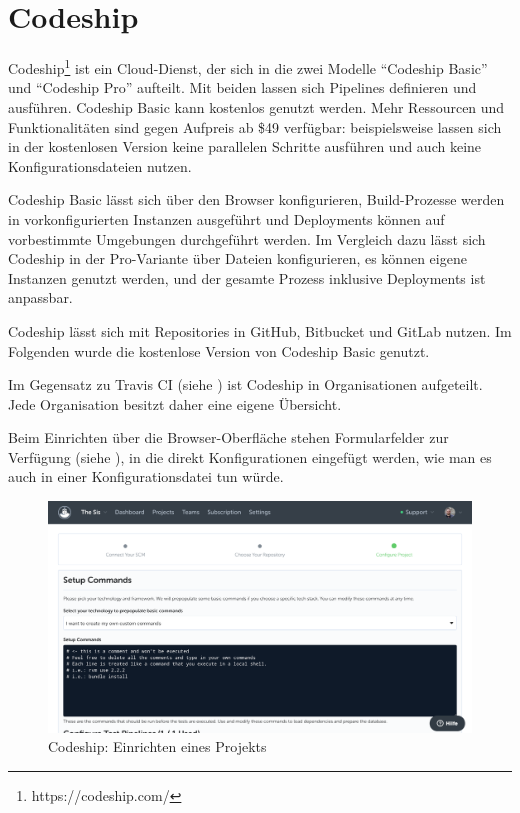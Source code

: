 \section{Codeship}
\label{sec:analyse-codeship}

Codeship\footnote{https://codeship.com/} ist ein Cloud-Dienst, der sich in die zwei Modelle ``Codeship Basic'' und ``Codeship Pro'' aufteilt. Mit beiden lassen sich Pipelines definieren und ausführen. Codeship Basic kann kostenlos genutzt werden. Mehr Ressourcen und Funktionalitäten sind gegen Aufpreis ab \$49 verfügbar: beispielsweise lassen sich in der kostenlosen Version keine parallelen Schritte ausführen und auch keine Konfigurationsdateien nutzen.

Codeship Basic lässt sich über den Browser konfigurieren, Build-Prozesse werden in vorkonfigurierten Instanzen ausgeführt und Deployments können auf vorbestimmte Umgebungen durchgeführt werden. Im Vergleich dazu lässt sich Codeship in der Pro-Variante über Dateien konfigurieren, es können eigene Instanzen genutzt werden, und der gesamte Prozess inklusive Deployments ist anpassbar.

Codeship lässt sich mit Repositories in GitHub, Bitbucket und GitLab nutzen. Im Folgenden wurde die kostenlose Version von Codeship Basic genutzt.

Im Gegensatz zu Travis CI (siehe ) ist Codeship in Organisationen aufgeteilt. Jede Organisation besitzt daher eine eigene Übersicht.

Beim Einrichten über die Browser-Oberfläche stehen Formularfelder zur Verfügung (siehe ), in die direkt Konfigurationen eingefügt werden, wie man es auch in einer Konfigurationsdatei tun würde.

\begin{figure}[h]
  \caption{Codeship: Einrichten eines Projekts}
  \label{fig:codeship-setup}
  \includegraphics[width=.8\textwidth]{assets/codeship-setup}
\end{figure}

